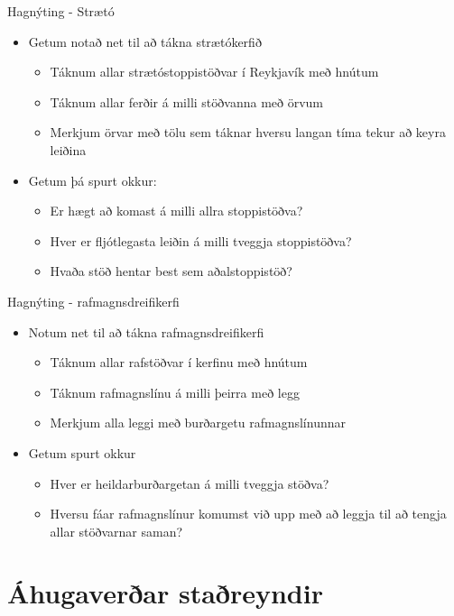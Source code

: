 \documentclass{beamer}
\begin{document}
\begin{frame}{Hagnýting - Strætó}
\begin{itemize} 
 \item Getum notað net til að tákna strætókerfið
 \begin{itemize}
  \item Táknum allar strætóstoppistöðvar í Reykjavík með hnútum
  \item Táknum allar ferðir á milli stöðvanna með örvum
  \item Merkjum örvar með tölu sem táknar hversu langan tíma tekur að keyra leiðina
 \end{itemize}
 \item Getum þá spurt okkur:
 \begin{itemize}
  \item Er hægt að komast á milli allra stoppistöðva?
  \item Hver er fljótlegasta leiðin á milli tveggja stoppistöðva?
  \item Hvaða stöð hentar best sem aðalstoppistöð?
 \end{itemize}
\end{itemize}
\end{frame}

\begin{frame}{Hagnýting - rafmagnsdreifikerfi}
\begin{itemize}
 \item Notum net til að tákna rafmagnsdreifikerfi
 \begin{itemize}
  \item Táknum allar rafstöðvar í kerfinu með hnútum
  \item Táknum rafmagnslínu á milli þeirra með legg
  \item Merkjum alla leggi með burðargetu rafmagnslínunnar
 \end{itemize}
 \item Getum spurt okkur
 \begin{itemize}
  \item Hver er heildarburðargetan á milli tveggja stöðva?
  \item Hversu fáar rafmagnslínur komumst við upp með að leggja til að tengja allar stöðvarnar saman?
 \end{itemize}
\end{itemize}
\end{frame}

\section{Áhugaverðar staðreyndir}
\end{document}
